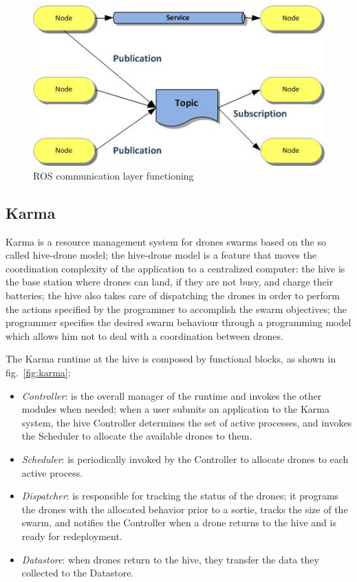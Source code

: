 \begin{figure}[htbp]
  \centering
  \includegraphics[width=\linewidth]{pictures/ros.jpg}
  \caption{ROS communication layer functioning}
  \label{fig:ros}
\end{figure}


\newpage

\subsection{Karma}\label{karma}

Karma\cite{karma} is a resource management system for drones swarms based on the so called hive-drone model; the hive-drone model is a feature that moves the coordination complexity of the application to a centralized computer: the hive is the base station where drones can land, if they are not busy, and charge their batteries; the hive also takes care of dispatching the drones in order to perform the actions specified by the programmer to accomplish the swarm objectives; the programmer specifies the desired swarm behaviour through a programming model which allows him not to deal with a coordination between drones.

The Karma\cite{karma} runtime at the hive is composed by functional blocks, as shown in fig.~\ref{fig:karma}:

\begin{itemize}
\itemsep2pt
\item{
\textit{Controller}: is the overall manager of the runtime and invokes the other modules when needed; when a user submits an application to the Karma system, the hive Controller determines the set of active processes, and invokes the Scheduler to allocate the available drones to them.
}
\item{
\textit{Scheduler}: is periodically invoked by the Controller to allocate drones to each active process.
}
\item{
\textit{Dispatcher}:  is responsible for tracking the status of the drones; it programs the drones with the allocated behavior prior to a sortie, tracks the size of the swarm, and notifies the Controller when a drone returns to the hive and is ready for redeployment.
}
\item{
\textit{Datastore}: when drones return to the hive, they transfer the data they collected to the Datastore.
}
\end{itemize}


